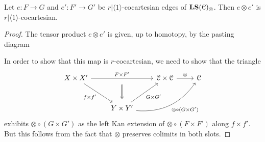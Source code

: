 \documentclass[main.tex]{subfiles}
\begin{document}
\begin{lemma}
  \label{lemma:tensor_product_of_local_systems_preserves_cocart_edges}
  Let $e\colon F \to G$ and $e'\colon F' \to G'$ be $r|\langle 1 \rangle$-cocartesian edges of $\mathbf{LS}(\mathcal{C})_{\otimes}$. Then $e \otimes e'$ is $r|\langle 1 \rangle$-cocartesian.
\end{lemma}
\begin{proof}
  The tensor product $e \otimes e'$ is given, up to homotopy, by the pasting diagram
  
  In order to show that this map is $r$-cocartesian, we need to show that the triangle
  \begin{equation*}
    \begin{tikzcd}[row sep=large]
      X \times X'
      \arrow[rr, "F \times F'", ""{below, name=M}]
      \arrow[dr, swap, "f \times f'"]
      && \category{C} \times \category{C}
      \arrow[r, "\otimes"]
      & \category{C}
      \\
      & Y \times Y'
      \arrow[urr, bend right, swap, "\otimes \circ (G \times G')"]
      \arrow[ur, swap, "G \times G'"]
      \arrow[from=M, Rightarrow, shorten=1ex]
    \end{tikzcd}
  \end{equation*}
  exhibits $\otimes \circ (G \times G')$ as the left Kan extension of $\otimes \circ (F \times F')$ along $f \times f'$. But this follows from the fact that $\otimes$ preserves colimits in both slots.
\end{proof}
\end{document}
